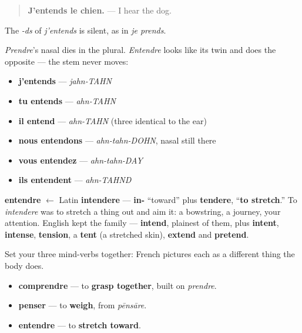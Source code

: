 \begin{quote}
\textbf{J'entends le chien.} — I hear the dog.
\end{quote}

The \emph{-ds} of \emph{j'entends} is silent, as in \emph{je prends}.

\begin{grammarlens}[title={Grammar Lens: the nasal that stays put}]
\emph{Prendre}'s nasal dies in the plural. \emph{Entendre} looks like its twin and does the opposite — the stem never moves:

\begin{itemize}
\raggedright
  \item \textbf{j'entends} — \emph{jahn-TAHN}
  \item \textbf{tu entends} — \emph{ahn-TAHN}
  \item \textbf{il entend} — \emph{ahn-TAHN} (three identical to the ear)
  \item \textbf{nous entendons} — \emph{ahn-tahn-DOHN}, nasal still there
  \item \textbf{vous entendez} — \emph{ahn-tahn-DAY}
  \item \textbf{ils entendent} — \emph{ahn-TAHND}
\end{itemize}
\end{grammarlens}

\begin{cousinweb}
\textbf{entendre} $\leftarrow$ Latin \textbf{intendere} — \textbf{in-} \textquotedblleft{}toward\textquotedblright{} plus \textbf{tendere}, \textquotedblleft{}\textbf{to stretch}.\textquotedblright{} To \emph{intendere} was to stretch a thing out and aim it: a bowstring, a journey, your attention. English kept the family — \textbf{intend}, plainest of them, plus \textbf{intent}, \textbf{intense}, \textbf{tension}, a \textbf{tent} (a stretched skin), \textbf{extend} and \textbf{pretend}.

Set your three mind-verbs together: French pictures each as a different thing the body does.

\begin{itemize}
\raggedright
  \item \textbf{comprendre} — to \textbf{grasp together}, built on \emph{prendre}.
  \item \textbf{penser} — to \textbf{weigh}, from \emph{pēnsāre}.
  \item \textbf{entendre} — to \textbf{stretch toward}.
\end{itemize}
\end{cousinweb}

